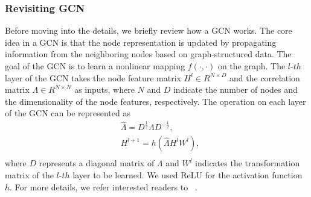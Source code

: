 \documentclass[10pt,twocolumn,letterpaper]{article}
\begin{document}
\subsubsection{Revisiting GCN}
Before moving into the details, we briefly review how a GCN works. The core idea in a GCN is that the node representation is updated by propagating information from the neighboring nodes based on graph-structured data. The goal of the GCN is to learn a nonlinear mapping $f(\cdot, \cdot)$ on the graph. The $l$-$th$ layer of the GCN takes the node feature matrix $H^{l} \in R^{N \times D}$ and the correlation matrix $\Lambda \in R^{N \times N}$ as inputs, where $N$ and $D$ indicate the number of nodes and the dimensionality of the node features, respectively. The operation on each layer of the GCN can be represented as
\begin{equation}
    \label{eq:gcn_revisited}
    \begin{aligned}
        & \hat{\Lambda} = D^{\frac{1}{2}}\Lambda D^{-\frac{1}{2}}, \\
        & H^{l+1} = h(\hat{\Lambda} H^{l} W^{l}), \\
    \end{aligned}
\end{equation}
where $D$ represents a diagonal matrix of $\Lambda$ and $W^{l}$ indicates the transformation matrix of the $l$-$th$ layer to be learned. We used ReLU for the activation function $h$. For more details, we refer interested readers to ~\cite{kipf2016semi}.
\end{document}
